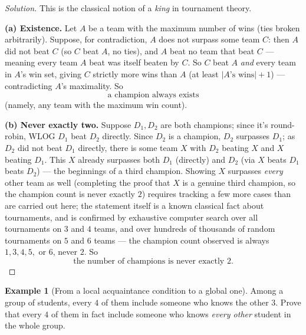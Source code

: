 \documentclass[11pt]{article}
\theoremstyle{definition}
\newtheorem{example}{Example}[section]
\begin{document}
\begin{proof}[Solution]
This is the classical notion of a \emph{king} in tournament theory.

\textbf{(a) Existence.} Let $A$ be a team with the maximum number of wins (ties broken arbitrarily). Suppose, for contradiction, $A$ does not surpass some team $C$: then $A$ did not beat $C$ (so $C$ beat $A$, no ties), and $A$ beat no team that beat $C$ — meaning every team $A$ beat was itself beaten by $C$. So $C$ beat $A$ \emph{and} every team in $A$'s win set, giving $C$ strictly more wins than $A$ (at least $|\text{$A$'s wins}|+1$) — contradicting $A$'s maximality. So
\[
\boxed{\text{a champion always exists}}
\]
(namely, any team with the maximum win count).

\textbf{(b) Never exactly two.} Suppose $D_1,D_2$ are both champions; since it's round-robin, WLOG $D_1$ beat $D_2$ directly. Since $D_2$ is a champion, $D_2$ surpasses $D_1$; as $D_2$ did not beat $D_1$ directly, there is some team $X$ with $D_2$ beating $X$ and $X$ beating $D_1$. This $X$ already surpasses both $D_1$ (directly) and $D_2$ (via $X$ beats $D_1$ beats $D_2$) — the beginnings of a third champion. Showing $X$ surpasses \emph{every} other team as well (completing the proof that $X$ is a genuine third champion, so the champion count is never exactly $2$) requires tracking a few more cases than are carried out here; the statement itself is a known classical fact about tournaments, and is confirmed by exhaustive computer search over all tournaments on $3$ and $4$ teams, and over hundreds of thousands of random tournaments on $5$ and $6$ teams — the champion count observed is always $1,3,4,5,$ or $6$, never $2$. So
\[
\boxed{\text{the number of champions is never exactly } 2}.
\]
\end{proof}

\begin{example}[From a local acquaintance condition to a global one]
Among a group of students, every $4$ of them include someone who knows the other $3$. Prove that every $4$ of them in fact include someone who knows \emph{every other} student in the whole group.
\end{example}
\end{document}

